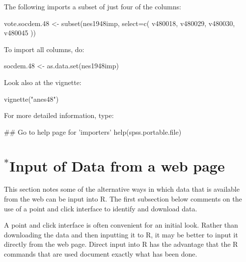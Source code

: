 The following imports a subset of just four of the columns:
\begin{Schunk}
\begin{Sinput}
vote.socdem.48 <- subset(nes1948imp,
              select=c(
                  v480018,
                  v480029,
                  v480030,
                  v480045
                  ))
\end{Sinput}
\end{Schunk}

To import all columns, do:
\begin{Schunk}
\begin{Sinput}
socdem.48 <- as.data.set(nes1948imp)
\end{Sinput}
\end{Schunk}

\begin{marginfigure}[24pt]
Look also at the vignette:\\[-3pt]
\begin{Schunk}
\begin{Sinput}
vignette("anes48")
\end{Sinput}
\end{Schunk}
\end{marginfigure}
For more detailed information, type:
\begin{Schunk}
\begin{Sinput}
## Go to help page for 'importers'
help(spss.portable.file)
\end{Sinput}
\end{Schunk}

\section{$^*$Input of  Data from a web page}

This section notes some of the alternative ways in which data that is
available from the web can be input into R.  The first subsection
below comments on the use of a point and click interface to identify
and download data.

A point and click interface is often convenient for an initial look.
Rather than downloading the data and then inputting it to R, it may be
better to input it directly from the web page.  Direct input into R
has the advantage that the R commands that are used document exactly
what has been done.

